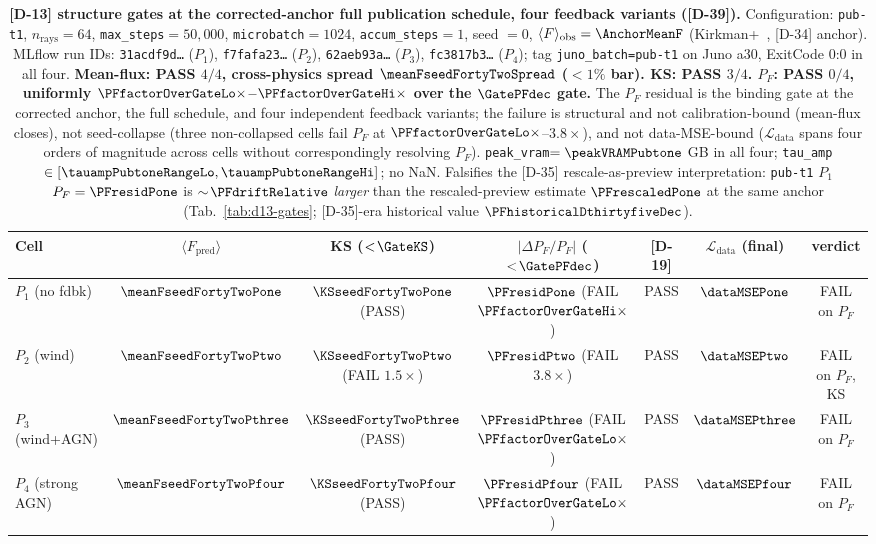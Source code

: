 \begin{table}[t]
    \centering
    \renewcommand{\arraystretch}{1.15}
    \setlength{\tabcolsep}{3pt}
    \footnotesize
    \begin{tabular}{l|cccccc}
    Cell & $\langle F_{\text{pred}}\rangle$ & KS ($<\!\GateKS$) & $|\Delta P_F/P_F|$ ($<\!\GatePFdec$) & [D-19] & $\mathcal{L}_{\text{data}}$ (final) & verdict \\
    \hline
    $P_1$ (no fdbk)    & $\meanFseedFortyTwoPone$ & $\KSseedFortyTwoPone$ (PASS) & $\mathbf{\PFresidPone}$ (FAIL $\mathbf{\PFfactorOverGateHi\times}$) & PASS & $\dataMSEPone$ & FAIL on $P_F$ \\
    $P_2$ (wind)       & $\meanFseedFortyTwoPtwo$ & $\mathbf{\KSseedFortyTwoPtwo}$ (FAIL $1.5\times$) & $\mathbf{\PFresidPtwo}$ (FAIL $\mathbf{3.8\times}$) & PASS & $\dataMSEPtwo$ & FAIL on $P_F$, KS \\
    $P_3$ (wind+AGN)   & $\meanFseedFortyTwoPthree$ & $\KSseedFortyTwoPthree$ (PASS) & $\mathbf{\PFresidPthree}$ (FAIL $\mathbf{\PFfactorOverGateLo\times}$) & PASS & $\dataMSEPthree$ & FAIL on $P_F$ \\
    $P_4$ (strong AGN) & $\meanFseedFortyTwoPfour$ & $\KSseedFortyTwoPfour$ (PASS) & $\mathbf{\PFresidPfour}$ (FAIL $\mathbf{\PFfactorOverGateLo\times}$) & PASS & $\dataMSEPfour$ & FAIL on $P_F$ \\
    \end{tabular}
    \caption{\textbf{[D-13] structure gates at the corrected-anchor full publication schedule, four feedback variants ([D-39]).} Configuration: \texttt{pub-t1}, $n_{\text{rays}}=64$, \texttt{max\_steps}$=50{,}000$, \texttt{microbatch}$=1024$, \texttt{accum\_steps}$=1$, seed $=0$, $\langle F\rangle_{\text{obs}}=\AnchorMeanF$ (Kirkman+~\cite{kirkman2007}, [D-34] anchor). MLflow run IDs: \texttt{31acdf9d\dots} ($P_1$), \texttt{f7fafa23\dots} ($P_2$), \texttt{62aeb93a\dots} ($P_3$), \texttt{fc3817b3\dots} ($P_4$); tag \texttt{juno\_batch=pub-t1} on Juno a30, ExitCode 0:0 in all four. \textbf{Mean-flux: PASS $4/4$, cross-physics spread $\meanFseedFortyTwoSpread$ ($<\!1\%$ bar). KS: PASS $3/4$. $P_F$: PASS $0/4$, uniformly $\PFfactorOverGateLo\times$--$\PFfactorOverGateHi\times$ over the $\GatePFdec$ gate.} The $P_F$ residual is the binding gate at the corrected anchor, the full schedule, and four independent feedback variants; the failure is structural and not calibration-bound (mean-flux closes), not seed-collapse (three non-collapsed cells fail $P_F$ at $\PFfactorOverGateLo\times$--$3.8\times$), and not data-MSE-bound ($\mathcal{L}_{\text{data}}$ spans four orders of magnitude across cells without correspondingly resolving $P_F$). \texttt{peak\_vram}$=\peakVRAMPubtone$ GB in all four; \texttt{tau\_amp} $\in[\tauampPubtoneRangeLo, \tauampPubtoneRangeHi]$; no NaN. Falsifies the [D-35] rescale-as-preview interpretation: \texttt{pub-t1} $P_1$ $P_F=\PFresidPone$ is $\sim\!\PFdriftRelative$ \emph{larger} than the rescaled-preview estimate $\PFrescaledPone$ at the same anchor (Tab.~\ref{tab:d13-gates}; [D-35]-era historical value $\PFhistoricalDthirtyfiveDec$).}
    \label{tab:pub-t1-gates}
\end{table}

